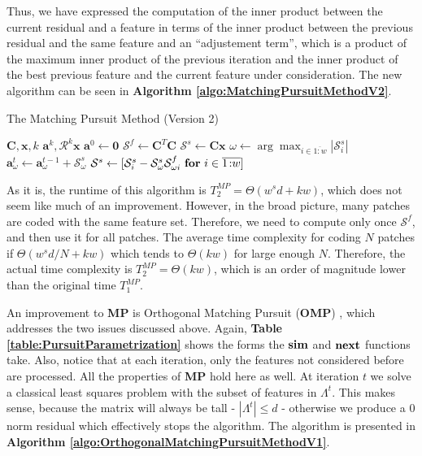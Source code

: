 \documentclass[12pt,a4paper,oneside,english]{UPBThesis}
\newcommand{\hcrange}[2]{\overline{{#1}\colon\!\!{#2}}}
\begin{document}
Thus, we have expressed the computation of the inner product between the current residual and a feature in terms of the inner product between the previous residual and the same feature and an ``adjustement term'', which is a product of the maximum inner product of the previous iteration and the inner product of the best previous feature and the current feature under consideration. The new algorithm can be seen in \textbf{Algorithm \ref{algo:MatchingPursuitMethodV2}}.

\begin{algorithm}
\caption{The Matching Pursuit Method (Version 2)}
\label{algo:MatchingPursuitMethodV2}
\begin{algorithmic}
\Require $\textbf{C},\textbf{x},k$
\Ensure $\textbf{a}^k,\mathcal{R}^k\textbf{x}$
\State $\textbf{a}^0 \gets \textbf{0}$
\State $\mathcal{S}^f \gets \textbf{C}^T\textbf{C}$
\State $\mathcal{S}^s \gets \textbf{C}\textbf{x}$
\For {$t = \hcrange{1}{k}$}
\State $\omega \gets \arg \max_{i \in \hcrange{1}{w}} \left| \mathcal{S}_i^s \right|$
\State $\textbf{a}_\omega^t \gets \textbf{a}_\omega^{t-1} + \mathcal{S}_\omega^s$
\State $\mathcal{S}^s \gets [ \mathcal{S}_i^s - \mathcal{S}_\omega^s \mathcal{S}_{\omega i}^f ~ \mbox{\textbf{for} $i \in \hcrange{1}{w}$} ]$
\EndFor
\end{algorithmic}
\end{algorithm}

As it is, the runtime of this algorithm is $T_2^{MP} = \Theta(w^sd + kw)$, which does not seem like much of an improvement. However, in the broad picture, many patches are coded with the same feature set. Therefore, we need to compute only once $\mathcal{S}^f$, and then use it for all patches. The average time complexity for coding $N$ patches if $\Theta(w^sd/N + kw)$ which tends to $\Theta(kw)$ for large enough $N$. Therefore, the actual time complexity is $T_2^{MP} = \Theta(kw)$, which is an order of magnitude lower than the original time $T_1^{MP}$.

An improvement to \textbf{MP} is Orthogonal Matching Pursuit (\textbf{OMP}) \cite{matchingpursuit2,orthopursuit,pursuitdifferences}, which addresses the two issues discussed above. Again, \textbf{Table \ref{table:PursuitParametrization}} shows the forms the $\text{\textbf{sim}}$ and $\text{\textbf{next}}$ functions take. Also, notice that at each iteration, only the features not considered before are processed. All the properties of \textbf{MP} hold here as well. At iteration $t$ we solve a classical least squares problem with the subset of features in $\Lambda^t$. This makes sense, because the matrix will always be tall - $\left| \Lambda^t \right| \leq d$ - otherwise we produce a $0$ norm residual which effectively stops the algorithm. The algorithm is presented in \textbf{Algorithm \ref{algo:OrthogonalMatchingPursuitMethodV1}}.
\end{document}
